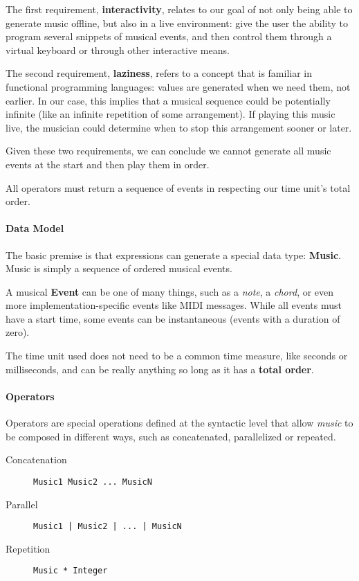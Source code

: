 \documentclass[a4paper,UKenglish,cleveref, autoref]{oasics-v2019}
\begin{document}
The first requirement, \textbf{interactivity}, relates to our goal of not only being able to generate music offline, but also in a live environment: give the user the ability to program several snippets of musical events, and then control them through a virtual keyboard or through other interactive means.

The second requirement, \textbf{laziness}, refers to a concept that is familiar in functional programming languages: values are generated when we need them, not earlier. In our case, this implies that a musical sequence could be potentially infinite (like an infinite repetition of some arrangement). If playing this music live, the musician could determine when to stop this arrangement sooner or later.

Given these two requirements, we can conclude we cannot generate all music events at the start and then play them in order. 

\begin{lemma}
\label{lemma:total-order} All operators must return a sequence of events in respecting our time unit's total order.
\end{lemma}

\paragraph*{Data Model}
The basic premise is that expressions can generate a special data type: \textbf{Music}. Music is simply a sequence of ordered musical events.

A musical \textbf{Event} can be one of many things, such as a \textit{note}, a \textit{chord}, or even more implementation-specific events like MIDI messages. While all events must have a start time, some events can be instantaneous (events with a duration of zero).

The time unit used does not need to be a common time measure, like seconds or milliseconds, and can be really anything so long as it has a \textbf{total order}.

\paragraph*{Operators}
Operators are special operations defined at the syntactic level that allow \textit{music} to be composed in different ways, such as concatenated, parallelized or repeated.

\begin{description}
    \item[Concatenation] \verb|Music1 Music2 ... MusicN|
    \item[Parallel] \verb'Music1 | Music2 | ... | MusicN'
    \item[Repetition] \verb'Music * Integer'
\end{description}
\end{document}
